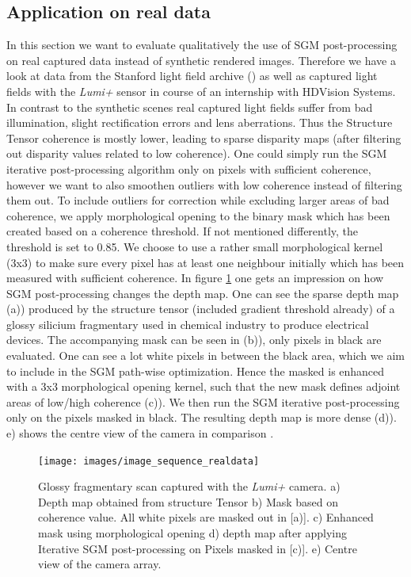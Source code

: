 \documentclass  [
  paper    = a4,
  BCOR     = 10mm,
  twoside,
  fontsize = 12pt,
  fleqn,
  toc      = bibnumbered,
  toc      = listofnumbered,
  numbers  = noendperiod,
  headings = normal,
  listof   = leveldown,
  version  = 3.03
]                                       {scrreprt}
\begin{document}
\subsection{Application on real data}
\label{realdata}
In this section we want to evaluate qualitatively the use of SGM post-processing on real captured data instead of synthetic rendered images. Therefore we have a look at data from the Stanford light field archive (\cite{wiburn2004high}) as well as captured light fields with the \textit{Lumi+} sensor in course of an internship with HDVision Systems. In contrast to the synthetic scenes real captured light fields suffer from bad illumination, slight rectification errors and lens aberrations. Thus the Structure Tensor coherence is mostly lower, leading to sparse disparity maps (after filtering out disparity values related to low coherence). One could simply run the SGM iterative post-processing algorithm only on pixels with sufficient coherence, however we want to also smoothen outliers with low coherence instead of filtering them out. To include outliers for correction while excluding larger areas of bad coherence, we apply morphological opening to the binary mask which has been created based on a coherence threshold. If not mentioned differently, the threshold is set to 0.85. We choose to use a rather small morphological kernel (3x3) to make sure every pixel has at least one neighbour initially which has been measured with sufficient coherence. In figure \ref{fig:imagesequencerealdata} one gets an impression on how SGM post-processing changes the depth map. One can see the sparse depth map (a)) produced by the structure tensor (included gradient threshold already) of a glossy silicium fragmentary used in chemical industry to produce electrical devices. The accompanying mask can be seen in (b)), only pixels in black are evaluated. One can see a lot white pixels in between the black area, which we aim to include in the SGM path-wise optimization. Hence the masked is enhanced with a 3x3 morphological opening kernel, such that the new mask defines adjoint areas of low/high coherence (c)). We then run the SGM iterative post-processing only on the pixels masked in black. The resulting depth map is more dense (d)). e) shows the centre view of the camera in comparison .

\begin{figure}
	\centering
	\texttt{[image: images/image\_sequence\_realdata]}
	\caption[Silicium Scan with iterative SGM]{Glossy fragmentary scan captured with the \textit{Lumi+} camera. a) Depth map obtained from structure Tensor b) Mask based on coherence value. All white pixels are masked out in [a)]. c) Enhanced mask using morphological opening d) depth map after applying Iterative SGM post-processing  on Pixels masked in [c)]. e) Centre view of the camera array.}
	\label{fig:imagesequencerealdata}
\end{figure}
\end{document}
